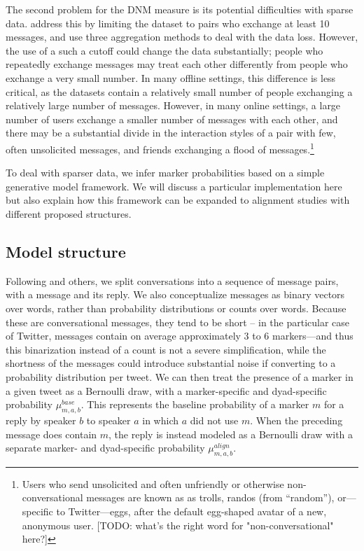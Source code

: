 \documentclass{acm_proc_article-sp}
\begin{document}
The second problem for the DNM measure is its potential difficulties with sparse data. \cite{DNMEtAl2012} address this by limiting the dataset to pairs who exchange at least 10 messages, and use three aggregation methods to deal with the data loss. However, the use of a such a cutoff could change the data substantially; people who repeatedly exchange messages may treat each other differently from people who exchange a very small number. In many offline settings, this difference is less critical, as the datasets contain a relatively small number of people exchanging a relatively large number of messages.  However, in many online settings, a large number of users exchange a smaller number of messages with each other, and there may be a substantial divide in the interaction styles of a pair with few, often unsolicited messages, and friends exchanging a flood of messages.\footnote{Users who send unsolicited and often unfriendly or otherwise non-conversational messages are known as  as trolls, randos (from ``random''), or---specific to Twitter---eggs, after the default egg-shaped avatar of a new, anonymous user. [TODO: what's the right word for "non-conversational" here?]}

To deal with sparser data, we infer marker probabilities based on a simple generative model framework.  We will discuss a particular implementation here but also explain how this framework can be expanded to alignment studies with different proposed structures. 

\subsection{Model structure}
Following \cite{DNMGamonDumais2011} and others, we split conversations into a sequence of message pairs, with a message and its reply. We also conceptualize messages as binary vectors over words, rather than probability distributions or counts over words.  Because these are conversational messages, they tend to be short -- in the particular case of Twitter, messages contain on average approximately 3 to 6 markers---and thus this binarization instead of a count is not a severe simplification, while the shortness of the messages could introduce substantial noise if converting to a probability distribution per tweet.  We can then treat the presence of a marker in a given tweet as a Bernoulli draw, with a marker-specific and dyad-specific probability $\mu^{base}_{m,a,b}$. This represents the baseline probability of a marker $m$ for a reply by speaker $b$ to speaker $a$ in which $a$ did not use $m$.  When the preceding message does contain $m$, the reply is instead modeled as a Bernoulli draw with a separate marker- and dyad-specific probability $\mu^{align}_{m,a,b}$.
\end{document}
